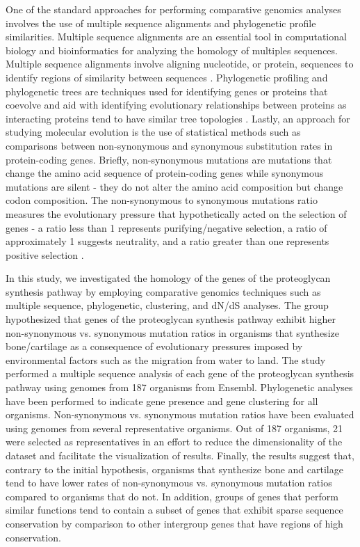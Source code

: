 \documentclass{article}
\begin{document}
One of the standard approaches for performing comparative genomics analyses involves the use of multiple sequence alignments and phylogenetic profile similarities. Multiple sequence alignments are an essential tool in computational biology and bioinformatics for analyzing the homology of multiples sequences. Multiple sequence alignments involve aligning nucleotide, or protein, sequences to identify regions of similarity between sequences \cite{msas}. Phylogenetic profiling and phylogenetic trees are techniques used for identifying genes or proteins that coevolve and aid with identifying evolutionary relationships between proteins as interacting proteins tend to have similar tree topologies \cite{protein_protein, graur}. Lastly, an approach for studying molecular evolution is the use of statistical methods such as comparisons between non-synonymous and synonymous substitution rates in protein-coding genes. Briefly, non-synonymous mutations are mutations that change the amino acid sequence of protein-coding genes while synonymous mutations are silent - they do not alter the amino acid composition but change codon composition. The non-synonymous to synonymous mutations ratio measures the evolutionary pressure that hypothetically acted on the selection of genes - a ratio less than 1 represents purifying/negative selection, a ratio of approximately 1 suggests neutrality, and a ratio greater than one represents positive selection \cite{dnds, graur}.

In this study, we investigated the homology of the genes of the proteoglycan synthesis pathway by employing comparative genomics techniques such as multiple sequence, phylogenetic, clustering, and dN/dS analyses. The group hypothesized that genes of the proteoglycan synthesis pathway exhibit higher non-synonymous vs. synonymous mutation ratios in organisms that synthesize bone/cartilage as a consequence of evolutionary pressures imposed by environmental factors such as the migration from water to land. The study performed a multiple sequence analysis of each gene of the proteoglycan synthesis pathway using genomes from 187 organisms from Ensembl. Phylogenetic analyses have been performed to indicate gene presence and gene clustering for all organisms. Non-synonymous vs. synonymous mutation ratios have been evaluated using genomes from several representative organisms. Out of 187 organisms, 21 were selected as representatives in an effort to reduce the dimensionality of the dataset and facilitate the visualization of results. Finally, the results suggest that, contrary to the initial hypothesis, organisms that synthesize bone and cartilage tend to have lower rates of non-synonymous vs. synonymous mutation ratios compared to organisms that do not. In addition, groups of genes that perform similar functions tend to contain a subset of genes that exhibit sparse sequence conservation by comparison to other intergroup genes that have regions of high conservation.
\end{document}

